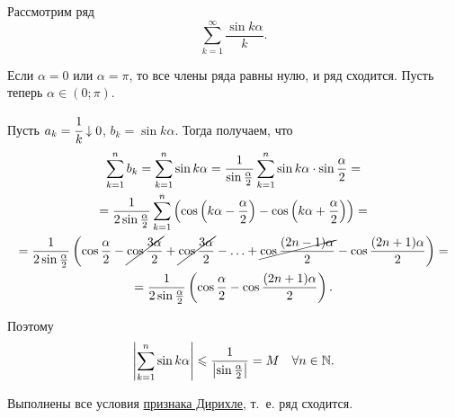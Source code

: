 \documentclass[../../main.tex]{subfiles}
\begin{document}
	\begin{example}
		Рассмотрим ряд
		\[\sum_{k = 1}^\infty\frac{\sin k\alpha}{k}.\]
		
		Если $\alpha = 0$ или $\alpha = \pi$, то все члены ряда равны нулю, 
		и ряд сходится. Пусть теперь $\alpha\in (0;\pi)$. 
		
		Пусть $a_k = \cfrac{1}{k}\downarrow 0$, $b_k = \sin k\alpha$. 
		Тогда получаем, что
		\begin{gather*}
			\sum_{k = 1}^n b_k = \sum_{k = 1}^n\sin k\alpha =
			\frac{1}{\sin\frac{\alpha}{2}}
			\sum_{k = 1}^n \sin k\alpha\cdot\sin\frac{\alpha}{2} = \\
			= \frac{1}{2\sin\frac{\alpha}{2}}
			\sum_{k = 1}^n\left(\cos\left(k\alpha - \frac{\alpha}{2}\right) - 
			\cos\left(k\alpha + \frac{\alpha}{2}\right)\right) = \\
			= \frac{1}{2\sin\frac{\alpha}{2}}\left(\cos\frac{\alpha}{2} - 
			\cancel{\cos\frac{3\alpha}{2}} + \cancel{\cos\frac{3\alpha}{2}} - 
			\ldots + \cancel{\cos\frac{(2n - 1)\alpha}{2}} - 
			\cos\frac{(2n + 1)\alpha}{2}\right) = \\
			= \frac{1}{2\sin\frac{\alpha}{2}}\left(\cos\frac{\alpha}{2} - 
			\cos\frac{(2n + 1)\alpha}{2}\right).
		\end{gather*}
		
		Поэтому
		\[\left|\sum_{k = 1}^n \sin k\alpha\right|\leqslant 
		\frac{1}{\left|\sin\frac{\alpha}{2}\right|} = M\quad \forall n \in \mathbb{N}.\]
		
		Выполнены все условия \hyperref[29:dirichle]{признака Дирихле}, т.~е. ряд сходится.
	\end{example}
\end{document}
